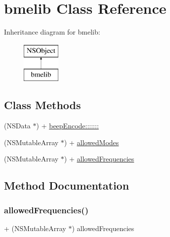 \hypertarget{interfacebmelib}{}\section{bmelib Class Reference}
\label{interfacebmelib}
Inheritance diagram for bmelib\+:\begin{figure}[H]
\begin{center}
\leavevmode
\includegraphics[height=2.000000cm]{interfacebmelib}
\end{center}
\end{figure}
\subsection*{Class Methods}
\begin{DoxyCompactItemize}
\item 
(N\+S\+Data $\ast$) + \mbox{\hyperlink{interfacebmelib_a65726775961be05028282831d3bc83fb}{beep\+Encode\+:::::::}}
\item 
(N\+S\+Mutable\+Array $\ast$) + \mbox{\hyperlink{interfacebmelib_a43dc77d50438093b591f4bb83ebce82f}{allowed\+Modes}}
\item 
(N\+S\+Mutable\+Array $\ast$) + \mbox{\hyperlink{interfacebmelib_a68104948a0882014d1c3e727b10271ee}{allowed\+Frequencies}}
\end{DoxyCompactItemize}


\subsection{Method Documentation}
\mbox{\label{interfacebmelib_a68104948a0882014d1c3e727b10271ee}} 
\subsubsection{\texorpdfstring{allowed\+Frequencies()}{allowedFrequencies()}}
{\footnotesize\ttfamily + (N\+S\+Mutable\+Array $\ast$) allowed\+Frequencies \begin{DoxyParamCaption}{ }\end{DoxyParamCaption}}

